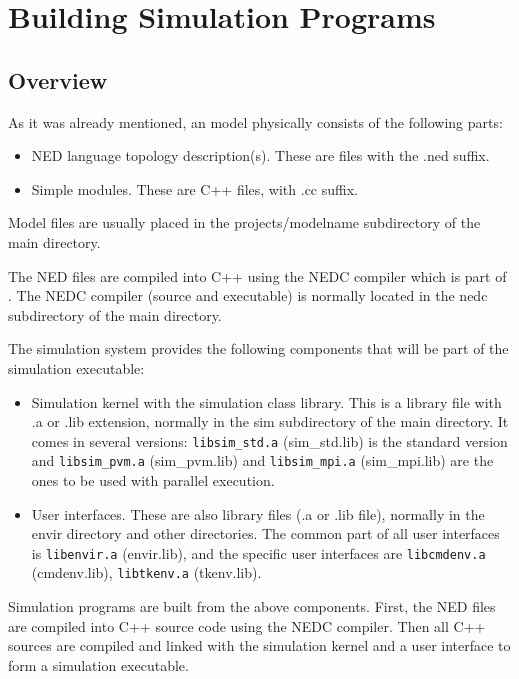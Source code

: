 \chapter{Building Simulation Programs}
\label{cha:building-simulation-programs}




\section{Overview}

As it was already mentioned, an {\opp} model physically consists of
the following parts:
\begin{itemize}
\item{NED language topology description(s). These
    are files with the .ned suffix.}
\item{Simple modules. These are C++ files, with .cc suffix.}
\end{itemize}

Model files are usually placed in the projects/modelname subdirectory
of the main {\opp} directory.


The NED files are compiled into C++ using the NEDC
compiler which is part of {\opp}. The NEDC
compiler (source and executable) is normally located in the nedc
subdirectory of the main {\opp} directory.


The simulation system provides the following components that will be
part of the simulation executable:
\begin{itemize}
\item{Simulation kernel with the simulation
    class library. This is a library
    file with .a or .lib extension, normally in the sim subdirectory
    of the main {\opp} directory. It comes in several versions:
    \texttt{libsim\_std.a} (sim\_std.lib) is the standard version and
    \texttt{libsim\_pvm.a} (sim\_pvm.lib) and \texttt{libsim\_mpi.a}
    (sim\_mpi.lib) are the ones to be used with parallel execution.}
\item{User interfaces. These are also library files (.a or .lib file),
    normally in the envir directory and other directories. The common
    part of all user interfaces is \texttt{libenvir.a} (envir.lib),
    and the specific user interfaces are \texttt{libcmdenv.a}
    (cmdenv.lib), \texttt{libtkenv.a} (tkenv.lib).}
\end{itemize}

Simulation programs are built from the above components. First, the
NED files are compiled into C++ source code using the
NEDC compiler. Then all C++ sources are compiled
and linked with the simulation kernel and a
user interface to form a simulation executable.


